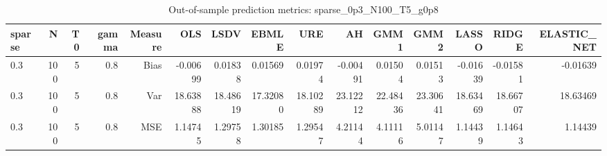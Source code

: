 \begin{table}[!htbp]\centering
\caption{Out-of-sample prediction metrics: sparse_0p3_N100_T5_g0p8}
\label{tab:table3_sparse_0p3_N100_T5_g0p8}
\begin{tabular}{lrrrrrrrrrrrrrr}
\hline
sparse & N & T0 & gamma & Measure & OLS & LSDV & EBMLE & URE & AH & GMM1 & GMM2 & LASSO & RIDGE & ELASTIC_NET \\
\hline
0.3 & 100 & 5 & 0.8 & Bias & -0.00699 & 0.01838 & 0.01569 & 0.01974 & -0.00491 & 0.01504 & 0.01513 & -0.01639 & -0.01581 & -0.01639 \\
0.3 & 100 & 5 & 0.8 & Var & 18.63888 & 18.48619 & 17.32080 & 18.10289 & 23.12212 & 22.48436 & 23.30641 & 18.63469 & 18.66707 & 18.63469 \\
0.3 & 100 & 5 & 0.8 & MSE & 1.14745 & 1.29758 & 1.30185 & 1.29547 & 4.21144 & 4.11116 & 5.01147 & 1.14439 & 1.14643 & 1.14439 \\
\hline
\end{tabular}
\end{table}

